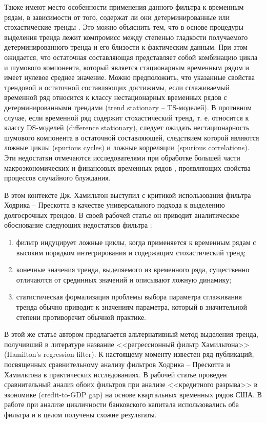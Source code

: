 \documentclass[a4paper,14pt]{extreport}
\begin{document}
	Также имеют место особенности применения данного фильтра к временным рядам, в зависимости от того, содержат ли они детерминированные или стохастические тренды \cite{kharin8}. Это можно объяснить тем, что в основе процедуры выделения тренда лежит компромисс между степенью гладкости получаемого детерминированного тренда и его близости к фактическим данным. При этом ожидается, что остаточная составляющая представляет собой комбинацию цикла и шумового компонента, который является стационарным временным рядом и имеет нулевое среднее значение. Можно предположить, что указанные свойства трендовой и остаточной составляющих достижимы, если сглаживаемый временной ряд относится к классу нестационарных временных рядов с детерминированными трендами (trend stationary -- TS-моделей).  В противном случае, если временной ряд содержит стохастический тренд, т. е. относится к классу DS-моделей (difference stationary), следует ожидать нестационарность шумового компонента в остаточной составляющей, следствием которой являются ложные циклы (spurious cycles) и ложные корреляции (spurious correlations). Эти недостатки отмечаются исследователями при обработке большей части макроэкономических и финансовых временных рядов \cite{schuler_detrend, harvey_detrend, pederson_hp}, проявляющих свойства процессов случайного блуждания.
	
	В этом контексте Дж. Хамильтон выступил с критикой использования фильтра Ходрика -- Прескотта в качестве универсального подхода к выделению долгосрочных трендов. В своей рабочей статье он приводит аналитическое обоснование следующих недостатков фильтра \cite{hamHP}:
	
	\begin{enumerate}
		\item фильтр индуцирует ложные циклы, когда применяется к временным рядам с высоким порядком интегрирования и содержащим стохастический тренд;
		\item конечные значения тренда, выделяемого из временного ряда, существенно отличаются от срединных значений и описывают ложную динамику;
		\item статистическая формализация проблемы выбора параметра сглаживания тренда обычно приводит к значениям параметра, который в значительной степени противоречит обычной практике.
	\end{enumerate}
	
	В этой же статье автором предлагается альтернативный метод выделения тренда, получивший в литературе название <<регрессионный фильтр Хамильтона>> (Hamilton's regression filter). К настоящему моменту известен ряд публикаций, посвященных сравнительному анализу фильтров Ходрика -- Прескотта и Хамильтона в практических исследованиях. В рабочей статье \cite{schuler_detrend} проведен сравнительный анализ обоих фильтров при анализе <<кредитного разрыва>> в экономике (credit-to-GDP gap) на основе квартальных временных рядов США. В работе \cite{haubrich_cyc_bank} при анализе цикличности банковского капитала использовались оба фильтра и в целом получены схожие результаты.
	
\end{document}
